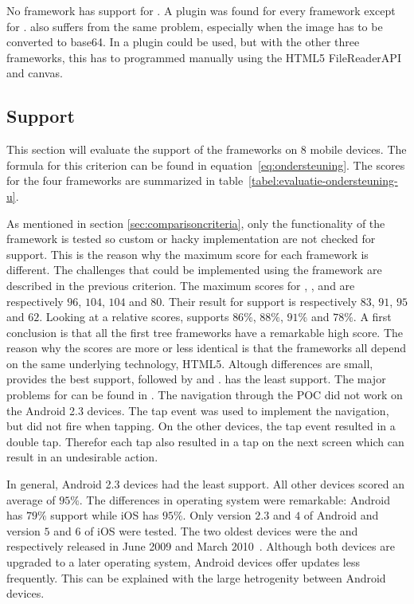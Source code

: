 \documentclass[a4paper]{artikel3}
\begin{document}
No framework has support for .
A plugin was found for every framework except for \lungo{}.
 also suffers from the same problem, especially when the image has to be converted to base64.
In \sta{} a plugin could be used, but with the other three frameworks, this has to programmed manually using the HTML5 FileReaderAPI and canvas. 


\subsection{Support} %
\label{sec:evaluation-support}

This section will evaluate the support of the frameworks on $8$ mobile devices.
The formula for this criterion can be found in equation~\ref{eq:ondersteuning}.
The scores for the four frameworks are summarized in table~\ref{tabel:evaluatie-ondersteuning-u}.


As mentioned in section \ref{sec:comparisoncriteria},  only the functionality of the framework is tested so custom or hacky implementation are not checked for support.
This is the reason why the maximum score for each framework is different.
The challenges that could be implemented using the framework are described in the previous criterion.
The maximum scores for \sta{},  \kendoa{},  \jqma{} and \lungo{} are respectively $96$, $104$, $104$ and $80$.
Their result for support is respectively $83$, $91$, $95$ and $62$.
Looking at a relative scores,  \sta{} supports $86\%$,  \kendoa{} $88\%$,  \jqma{} $91\%$ and \lungo{} $78\%$.
A first conclusion is that all the first tree frameworks have a remarkable high score.
The reason why the scores are more or less identical is that the frameworks all depend on the same underlying technology,  HTML5.
Altough differences are small,  \jqma{} provides the best support,  followed by \kendoa{} and \sta{}.
\lungo{} has the least support.
The major problems for \lungo{} can be found in .
The navigation through the POC did not work on the Android 2.3 devices. 
The tap event was used to implement the navigation, but did not fire when tapping.
On the other devices, the tap event resulted in a double tap.
Therefor each tap also resulted in a tap on the next screen which can result in an undesirable action.

In general,  Android 2.3 devices had the least support.
All other devices scored an average of $95\%$.
The differences in operating system were remarkable:  Android has $79\%$ support while iOS has $95\%$.
Only version $2.3$ and $4$ of Android and version $5$ and $6$ of iOS were tested.
The two oldest devices were the \iphoneiii{} and \gs{} respectively released in June 2009 and March 2010~\cite{Staff2009,Gideon2010}.
Although both devices are upgraded to a later operating system,  Android devices offer updates less frequently.
This can be explained with the large hetrogenity between Android devices.
\end{document}
